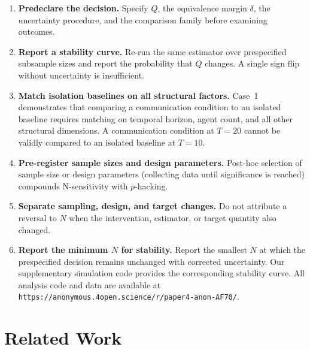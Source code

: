 \documentclass[11pt]{article}
\begin{document}
\begin{enumerate}[leftmargin=*,nosep]
    \item \textbf{Predeclare the decision.} Specify $Q$, the equivalence margin $\delta$, the uncertainty procedure, and the comparison family before examining outcomes.
    \item \textbf{Report a stability curve.} Re-run the same estimator over prespecified subsample sizes and report the probability that $Q$ changes. A single sign flip without uncertainty is insufficient.
    \item \textbf{Match isolation baselines on all structural factors.} Case~1 demonstrates that comparing a communication condition to an isolated baseline requires matching on temporal horizon, agent count, and all other structural dimensions. A communication condition at $T{=}20$ cannot be validly compared to an isolated baseline at $T{=}10$.
    \item \textbf{Pre-register sample sizes and design parameters.} Post-hoc selection of sample size or design parameters (collecting data until significance is reached) compounds N-sensitivity with $p$-hacking.
    \item \textbf{Separate sampling, design, and target changes.} Do not attribute a reversal to $N$ when the intervention, estimator, or target quantity also changed.
    \item \textbf{Report the minimum $N$ for stability.} Report the smallest $N$ at which the prespecified decision remains unchanged with corrected uncertainty. Our supplementary simulation code provides the corresponding stability curve. All analysis code and data are available at \texttt{https://anonymous.4open.science/r/paper4-anon-AF70/}.
\end{enumerate}

\section{Related Work}
\end{document}
